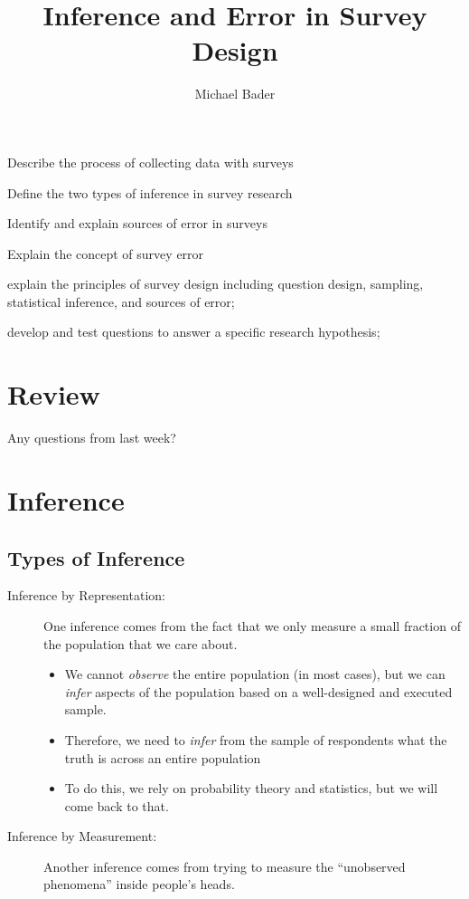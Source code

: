 \documentclass[11pt]{lecturenotes}
\title{Inference and Error in Survey Design}
\author{Michael Bader}
\begin{document}
\maketitle

\begin{objectives}{
\item Describe the process of collecting data with surveys
\item Define the two types of inference in survey research
\item Identify and explain sources of error in surveys 
\item Explain the concept of survey error}{
\item explain the principles of survey design including question design, sampling, statistical inference, and sources of error;
\item develop and test questions to answer a specific research hypothesis; 
}
\end{objectives}

\section[10]{Review}
Any questions from last week? 

\section{Inference}
\slide
{}

\subsection[7.5]{Types of Inference}
\begin{description}
\item[Inference by Representation:] One inference comes from the fact that we only measure a small fraction of the population that we care about. 
\begin{itemize}
\item We cannot \emph{observe} the entire population (in most cases), but we can \emph{infer} aspects of the population based on a well-designed and executed sample. 
\item Therefore, we need to \emph{infer} from the sample of respondents what the truth is across an entire population
\item To do this, we rely on probability theory and statistics, but we will come back to that. 
\end{itemize}
\item[Inference by Measurement:] Another inference comes from trying to measure the ``unobserved phenomena'' inside people's heads. 
\end{description}
\end{document}
